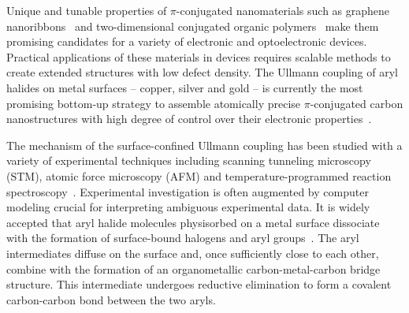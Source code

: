 \documentclass[aps,prb,amsmath,amssymb,11pt]{revtex4-1}
\begin{document}
\maketitle


Unique and tunable properties of $\pi$-conjugated nanomaterials such as graphene nanoribbons~\cite{ullmann_106, ullmann_45, ullmann_107, ullmann_101, Ullmann_153} and two-dimensional conjugated organic polymers~\cite{Ullmann_154, ullmann_148, Ullmann_156, Ullmann_157, Ullmann_158, Ullmann_159, Ullmann_160, Ullmann_161, Ullmann_162, Ullmann_163, Ullmann_164} make them promising candidates for a variety of electronic and optoelectronic devices. Practical applications of these materials in devices requires scalable methods to create extended structures with low defect density.
The Ullmann coupling of aryl halides on metal surfaces -- copper, silver and gold -- is currently the most promising bottom-up strategy to assemble atomically precise $\pi$-conjugated carbon nanostructures with high degree of control over their electronic properties~\cite{ullmann_33, ullmann_42, ullmann_43, ullmann_45, ullmann_46,ullmann_47, ullmann_140, ullmann_148, ullmann_149, ullmann_98, jacs2016, ullmann_152}. 

The mechanism of the surface-confined Ullmann coupling has been studied with a variety of experimental techniques including scanning tunneling microscopy (STM), atomic force microscopy (AFM) and temperature-programmed reaction spectroscopy~\cite{sur_sci01, Ullmann_165, Ullmann_166, Ullmann_167, ullmann_143, ullmann_88,  ullmann_141, ullmann_142, ullmann_87, sur_sci02, ullmann_144}. Experimental investigation is often augmented by computer modeling crucial for interpreting ambiguous experimental data.
It is widely accepted that aryl halide molecules physisorbed on a metal surface dissociate with the formation of surface-bound halogens and aryl groups~\cite{ullmann_145, sur_sci01, ullmann_87, sur_sci03}. The aryl intermediates diffuse on the surface and, once sufficiently close to each other, combine with the formation of an organometallic carbon-metal-carbon bridge structure. This intermediate undergoes reductive elimination to form a covalent carbon-carbon bond between the two aryls. 
\end{document}
